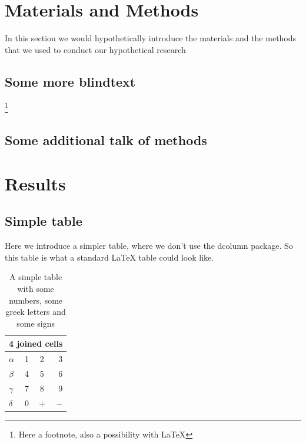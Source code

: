 \documentclass[titlepage]{article}
\begin{document}
\section{Materials and Methods}
In this section we would hypothetically introduce the materials and the methods that we used to conduct our hypothetical research
\subsection{Some more blindtext}
\blindtext[1]\footnote{Here a footnote, also a possibility with LaTeX}
\blindtext[1]
\subsection{Some additional talk of methods}
\blindtext[1]

\section{Results}
\blindtext[1]
\subsection{Simple table}
Here we introduce a simpler table, where we don't use the dcolumn package. So this table is what a standard LaTeX table could look like.
\begin{table}[H]
  \centering
    \begin{tabular}{|l|c c r|}
    \hline
    \multicolumn{4}{|c|}{4 joined cells}\\
    \hline
    $\alpha$ & 1 & 2 & 3 \\
    $\beta$ & 4 & 5 & 6 \\
    $\gamma$ & 7 & 8 & 9 \\
    $\delta$ & $0$ & $+$ & $-$\\
    \hline
    \end{tabular}
  \caption{A simple table with some numbers, some greek letters and some signs}
\end{table}
\end{document}
